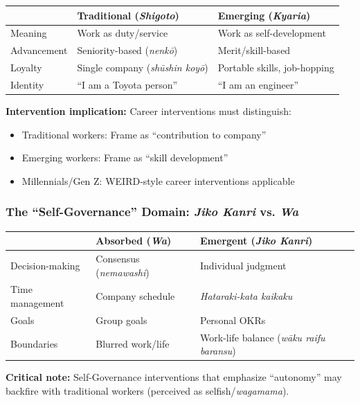 \begin{center}
\begin{tabular}{@{}lp{5cm}p{5cm}@{}}
\toprule
& \textbf{Traditional (\textit{Shigoto})} & \textbf{Emerging (\textit{Kyaria})} \\
\midrule
Meaning & Work as duty/service & Work as self-development \\
Advancement & Seniority-based (\textit{nenkō}) & Merit/skill-based \\
Loyalty & Single company (\textit{shūshin koyō}) & Portable skills, job-hopping \\
Identity & ``I am a Toyota person'' & ``I am an engineer'' \\
\bottomrule
\end{tabular}
\end{center}

\textbf{Intervention implication:} Career interventions must distinguish:
\begin{itemize}[nosep]
\item Traditional workers: Frame as ``contribution to company''
\item Emerging workers: Frame as ``skill development''
\item Millennials/Gen Z: WEIRD-style career interventions applicable
\end{itemize}

\subsubsection{The ``Self-Governance'' Domain: \textit{Jiko Kanri} vs. \textit{Wa}}

\begin{center}
\begin{tabular}{@{}lp{5cm}p{5cm}@{}}
\toprule
& \textbf{Absorbed (\textit{Wa})} & \textbf{Emergent (\textit{Jiko Kanri})} \\
\midrule
Decision-making & Consensus (\textit{nemawashi}) & Individual judgment \\
Time management & Company schedule & \textit{Hataraki-kata kaikaku} \\
Goals & Group goals & Personal OKRs \\
Boundaries & Blurred work/life & Work-life balance (\textit{wāku raifu baransu}) \\
\bottomrule
\end{tabular}
\end{center}

\textbf{Critical note:} Self-Governance interventions that emphasize ``autonomy'' may backfire with traditional workers (perceived as selfish/\textit{wagamama}).

